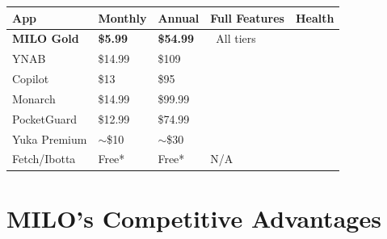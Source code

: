 \documentclass[11pt,a4paper]{report}
\newcommand{\cmark}{\textcolor{successgreen}{\ding{51}}}
\newcommand{\xmark}{\textcolor{dangerred}{\ding{55}}}
\begin{document}
\begin{center}
\renewcommand{\arraystretch}{1.5}
\begin{tabular}{>{\raggedright\arraybackslash}p{3.5cm} >{\centering\arraybackslash}p{2.5cm} >{\centering\arraybackslash}p{2.5cm} >{\centering\arraybackslash}p{2.5cm} >{\centering\arraybackslash}p{2.5cm}}
\toprule
\rowcolor{kbcblue!15}
\textbf{App} & \textbf{Monthly} & \textbf{Annual} & \textbf{Full Features} & \textbf{Health} \\
\midrule
\rowcolor{successgreen!15}
\textcolor{kbcblue}{\textbf{MILO Gold}} & \textcolor{successgreen}{\textbf{\$5.99}} & \textcolor{successgreen}{\textbf{\$54.99}} & \cmark\ All tiers & \cmark \\
YNAB & \$14.99 & \$109 & \cmark & \xmark \\
\rowcolor{lightbg}
Copilot & \$13 & \$95 & \cmark & \xmark \\
Monarch & \$14.99 & \$99.99 & \cmark & \xmark \\
\rowcolor{lightbg}
PocketGuard & \$12.99 & \$74.99 & \cmark & \xmark \\
Yuka Premium & $\sim$\$10 & $\sim$\$30 & \cmark & \cmark \\
\rowcolor{lightbg}
Fetch/Ibotta & Free* & Free* & N/A & \xmark \\
\bottomrule
\end{tabular}
\end{center}

\vspace{0.3cm}

\begin{center}
\end{center}

\newpage

\section{MILO's Competitive Advantages}
\end{document}
